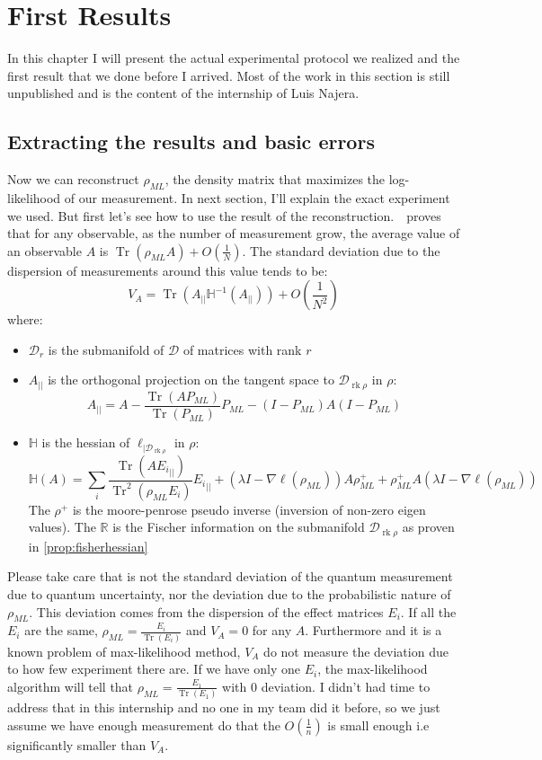 \documentclass[10pt]{report}
\theoremstyle{plain}
\theoremstyle{definition}
\theoremstyle{remark}
\DeclareMathOperator{\Tr}{Tr}
\DeclareMathOperator{\rk}{rk}
\newcommand{\trnorm}[1]{\frac{#1}{\Tr\left({#1}\right)}}
\newcommand{\ml}{_{M\!L}}
\begin{document}
\chapter{First Results}

In this chapter I will present the actual experimental protocol we realized and the
first result that we done before I arrived.
Most of the work in this section is still unpublished and is the
content of the internship of Luis Najera.

\section{Extracting the results and basic errors}\label{sec:basicerr}

Now we can reconstruct $\rho\ml$, the density matrix that maximizes the
log-likelihood of our measurement. In next section, I'll explain the exact
experiment we used. But first let's see how to use the result of the
reconstruction.~\cite{SPRAL17}~proves that for any observable, as the number of
measurement grow, the average value of an observable $A$ is $\Tr(\rho_{ML}A) +
O(\frac 1 N)$. The standard deviation due to the dispersion of measurements
 around this value tends to be:
\newcommand{\pr}{_{||}}
\newcommand{\inv}{^{-1}}
\begin{equation}\label{eqn:var}
V_A = \Tr(A\pr \mathbb H\inv(A\pr)) +O(\frac 1 {N^2})
\end{equation}
where:
\begin{itemize}
\item $\mathcal{D}_r$ is the submanifold of $\mathcal{D}$ of matrices with rank $r$
\item $A\pr$ is
  the orthogonal projection on the tangent space to $\mathcal{D}_{\rk \rho}$ in
  $\rho$:
  \[A\pr = A - \frac{\Tr(AP\ml)}{\Tr(P\ml)}P\ml - (I-P\ml)A(I-P\ml)\]
\item $\mathbb H$ is the hessian of $\ell_{|\mathcal{D}_{\rk \rho}}$ in $\rho$:
  \[\mathbb{H}(A) = \sum_i \frac{\Tr(A{E_i}\pr)}{\Tr^2(\rho\ml E_i)} {E_i}\pr +
    (\lambda I - \nabla \ell(\rho\ml))A\rho\ml^+ +
    \rho\ml^+A(\lambda I - \nabla \ell(\rho\ml))\]
  The $\rho^+$ is the moore-penrose pseudo inverse (inversion of non-zero eigen
  values). The $\mathbb R$ is the Fischer information on the submanifold
  $\mathcal{D}_{\rk \rho}$ as proven in \cref{prop:fisherhessian}
\end{itemize}

Please take care that is not the standard deviation of the quantum measurement
due to quantum uncertainty, nor the deviation due to the probabilistic nature of
$\rho\ml$. This deviation comes from the dispersion of the effect matrices
$E_i$. If all the $E_i$ are the same, $\rho\ml = \trnorm{E_i}$ and $V_A = 0$ for
any $A$. Furthermore and it is a known problem of max-likelihood method, $V_A$
do not measure the deviation due to how few experiment there are. If we have
only one $E_i$, the max-likelihood algorithm will tell that $\rho\ml =
\trnorm{E_1}$ with 0 deviation. I didn't had time to address that in this
internship and no one in my team did it before, so we just assume we have
enough measurement do that the $O(\frac1n)$ is small enough i.e significantly
smaller than $V_A$.
\end{document}
